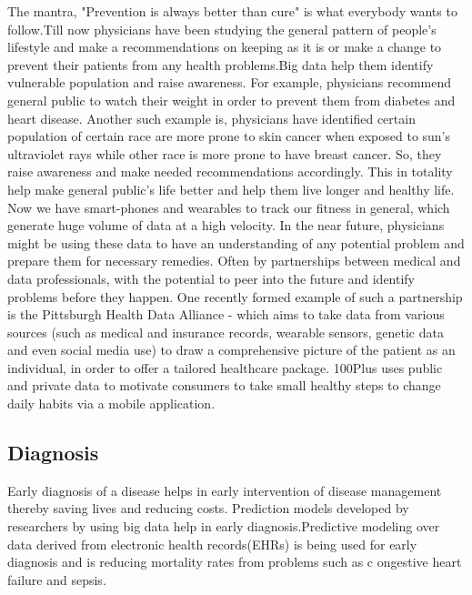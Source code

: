\documentclass[sigconf]{acmart}
\begin{document}
The mantra, "Prevention is always better than cure" is what everybody
wants to follow.Till now physicians have been studying the general pattern of people's lifestyle and make a recommendations on 
keeping as it is or make a change to prevent their patients from any health problems.Big data help them identify vulnerable 
population and raise awareness. For example, physicians recommend general public to watch their weight in order to prevent them 
from diabetes and heart disease. Another such example is, physicians have identified certain population of certain race are more
prone to skin cancer when exposed to sun's ultraviolet rays while other race is more prone to have breast cancer. So, they 
raise awareness and make needed recommendations accordingly. This in totality help make general public's life better and help them live
longer and healthy life. Now we have smart-phones and wearables to track our fitness in general, which generate huge volume of data 
at a high velocity. In the near future, physicians might be using these data to have an understanding of any potential problem 
and prepare them for necessary remedies. Often by partnerships between medical and data professionals, with the potential to peer 
into the future and identify problems before they happen\cite{www-forbes-com}. One recently formed example of such a partnership is 
the Pittsburgh Health Data Alliance - which aims to take data from various sources (such as medical and insurance records, 
wearable sensors, genetic data and even social media use) to draw a comprehensive picture of the patient as an individual, in order 
to offer a tailored healthcare package\cite{www-forbes-com}. 100Plus uses public and private data to motivate consumers to take 
small healthy steps to change daily habits via a mobile application\cite{www-ghdonline-org}.  

 

\subsection{Diagnosis}
Early diagnosis of a disease helps in early intervention of disease management thereby saving lives and reducing costs. 
Prediction models developed by researchers by using big data help in early diagnosis.Predictive modeling over data derived 
from electronic health records(EHRs) is being used for early diagnosis and is reducing mortality rates from problems such as c
ongestive heart failure and sepsis\cite{www-mapr-com}.
\end{document}
